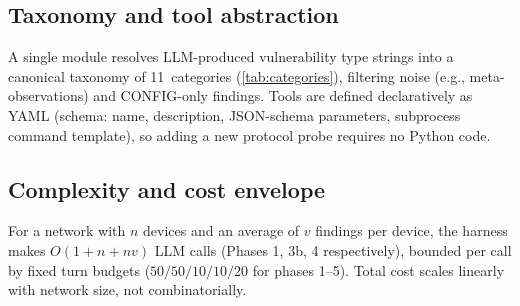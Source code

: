\subsection{Taxonomy and tool abstraction}
\label{sec:harness:taxonomy}

A single module resolves LLM-produced vulnerability type strings into a
canonical taxonomy of 11~categories (\cref{tab:categories}), filtering noise
(e.g., meta-observations) and CONFIG-only findings. Tools are defined
declaratively as YAML (schema: name, description, JSON-schema parameters,
subprocess command template), so adding a new protocol probe requires no
Python code.

\subsection{Complexity and cost envelope}
\label{sec:harness:cost}

For a network with $n$ devices and an average of $v$ findings per device, the
harness makes $O(1+n+nv)$ LLM calls (Phases 1, 3b, 4 respectively), bounded
per call by fixed turn budgets ($50/50/10/10/20$ for phases 1--5). Total cost
scales linearly with network size, not combinatorially.
